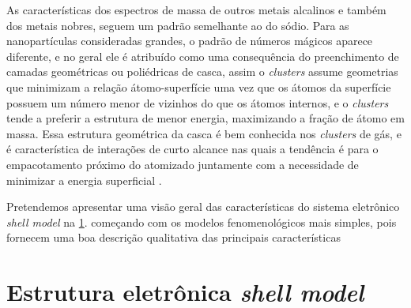 As características dos espectros de massa de outros metais alcalinos e também dos metais nobres, seguem um padrão semelhante ao do sódio. Para as nanopartículas consideradas grandes, o padrão de números mágicos aparece diferente, e no geral ele é atribuído como uma consequência do preenchimento de camadas geométricas ou poliédricas de casca, assim o \textit{clusters} assume geometrias que minimizam a relação átomo-superfície uma vez que os átomos da superfície possuem um número menor de vizinhos do que os átomos internos, e o \textit{clusters} tende a preferir a estrutura de menor energia, maximizando a fração de átomo em massa. Essa estrutura geométrica da casca é bem conhecida nos \textit{clusters} de gás, e é característica de interações de curto alcance nas quais a tendência é para o empacotamento próximo do atomizado juntamente com a necessidade de minimizar a energia superficial \cite{capitulo_livro_shell}.



Pretendemos apresentar uma visão geral das características do sistema eletrônico \textit{shell model} na \ref{section_shell_model}.  começando com os modelos fenomenológicos mais simples, pois fornecem uma boa descrição qualitativa das principais características




\section{Estrutura eletrônica \textit{shell model}}\label{section_shell_model}






